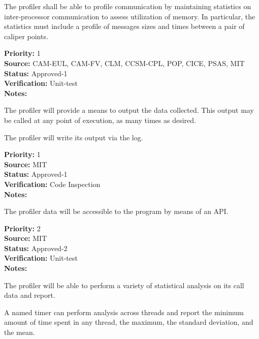 The profiler shall be able to profile communication by maintaining
statistics on inter-processor communication to assess utilization of
memory. In particular, the statistics must include a profile of
messages sizes and times between a pair of caliper points.

\begin{reqlist}
{\bf Priority:} 1 \\
{\bf Source:} CAM-EUL, CAM-FV, CLM, CCSM-CPL, POP, CICE, PSAS, MIT \\
{\bf Status:} Approved-1 \\
{\bf Verification:} Unit-test \\
{\bf Notes:} 
\end{reqlist}


The profiler will provide a means to output the data collected.  This
output may be called at any point of execution, as many times as
desired.


The profiler will write its output via the log.  

\begin{reqlist}
{\bf Priority:} 1 \\
{\bf Source:}  MIT \\
{\bf Status:} Approved-1 \\
{\bf Verification:} Code Inspection \\
{\bf Notes:} 
\end{reqlist}


The profiler data will be accessible to the program by means of an API.
\begin{reqlist}
{\bf Priority:} 2 \\
{\bf Source:} MIT  \\
{\bf Status:} Approved-2 \\
{\bf Verification:} Unit-test \\
{\bf Notes:} 
\end{reqlist}


The profiler will be able to perform a variety of statistical analysis
on its call data and report.


A named timer can perform analysis across threads and report the 
minimum amount of time spent in any thread, the maximum, the standard
deviation, and the mean.

